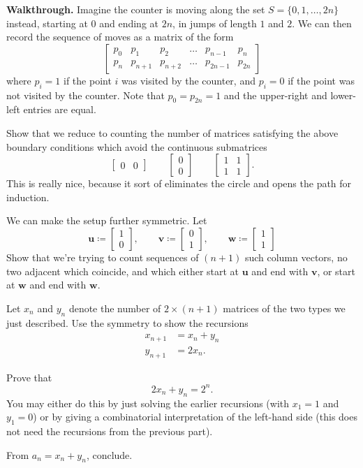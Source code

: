 \documentclass[11pt]{scrartcl}
\providecommand{\ii}{\item}
\newenvironment{walkthrough}{\noindent\textbf{\color{green!40!black}Walkthrough.}}{}
\begin{document}
\begin{walkthrough}
Imagine the counter is moving along the set $S = \{0, 1, \dots, 2n\}$ instead,
starting at $0$ and ending at $2n$, in jumps of length $1$ and $2$.
We can then record the sequence of moves as a matrix of the form
\[
  \begin{bmatrix}
    p_0 & p_1 & p_2 & \dots & p_{n-1} & p_n \\
    p_n & p_{n+1} & p_{n+2} & \dots & p_{2n-1} & p_{2n}
  \end{bmatrix}
\]
where $p_i = 1$ if the point $i$ was visited by the counter,
and $p_i = 0$ if the point was not visited by the counter.
Note that $p_0 = p_{2n} = 1$ and the upper-right and lower-left entries are equal.

\begin{walk}
  \ii Show that we reduce to counting the number of matrices
  satisfying the above boundary conditions
  which avoid the continuous submatrices
  \[
    \begin{bmatrix} 0 & 0 \end{bmatrix}
    \qquad
    \begin{bmatrix} 0 \\ 0 \end{bmatrix}
    \qquad
    \begin{bmatrix} 1 & 1 \\ 1 & 1 \end{bmatrix}.
  \]
  This is really nice, because it sort of eliminates the circle
  and opens the path for induction.

  \ii We can make the setup further symmetric.
  Let
  \[
  \mathbf u \coloneq \begin{bmatrix} 1 \\ 0 \end{bmatrix}, \qquad
  \mathbf v \coloneq \begin{bmatrix} 0 \\ 1 \end{bmatrix}, \qquad
  \mathbf w \coloneq \begin{bmatrix} 1 \\ 1 \end{bmatrix}
  \]
  Show that we're trying to count sequences of $(n+1)$ such column vectors,
  no two adjacent which coincide,
  and which either start at $\mathbf u$ and end with $\mathbf v$,
  or start at $\mathbf w$ and end with $\mathbf w$.

  \ii Let $x_n$ and $y_n$ denote the number of $2 \times (n+1)$ matrices
  of the two types we just described.
  Use the symmetry to show the recursions
  \begin{align*}
    x_{n+1} &= x_n + y_n \\
    y_{n+1} &= 2x_n.
  \end{align*}

  \ii Prove that \[ 2x_n + y_n = 2^n. \]
  You may either do this by just solving the earlier recursions
  (with $x_1 = 1$ and $y_1 = 0$)
  or by giving a combinatorial interpretation of the left-hand side
  (this does not need the recursions from the previous part).

  \ii From $a_n = x_n + y_n$, conclude.
\end{walk}
\end{walkthrough}
\end{document}
